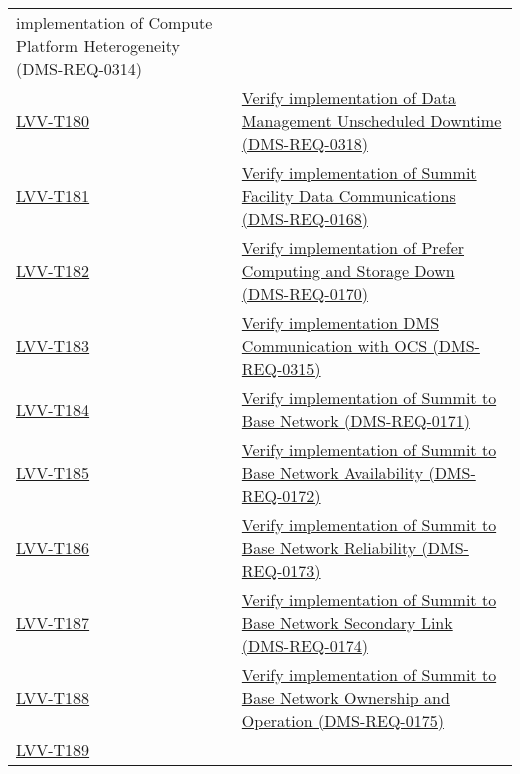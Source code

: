 \begin{longtable}[]{p{3cm}p{13cm}}
{implementation of Compute Platform Heterogeneity
(DMS-REQ-0314)}\tabularnewline
\protect\hyperlink{lvv-t180---verify-implementation-of-data-management-unscheduled-downtime-dms-req-0318}{LVV-T180}
&
\href{https://jira.lsstcorp.org/secure/Tests.jspa\#/testCase/LVV-T180}{Verify
implementation of Data Management Unscheduled Downtime
(DMS-REQ-0318)}\tabularnewline
\protect\hyperlink{lvv-t181---verify-implementation-of-summit-facility-data-communications-dms-req-0168}{LVV-T181}
&
\href{https://jira.lsstcorp.org/secure/Tests.jspa\#/testCase/LVV-T181}{Verify
implementation of Summit Facility Data Communications
(DMS-REQ-0168)}\tabularnewline
\protect\hyperlink{lvv-t182---verify-implementation-of-prefer-computing-and-storage-down-dms-req-0170}{LVV-T182}
&
\href{https://jira.lsstcorp.org/secure/Tests.jspa\#/testCase/LVV-T182}{Verify
implementation of Prefer Computing and Storage Down
(DMS-REQ-0170)}\tabularnewline
\protect\hyperlink{lvv-t183---verify-implementation-dms-communication-with-ocs-dms-req-0315}{LVV-T183}
&
\href{https://jira.lsstcorp.org/secure/Tests.jspa\#/testCase/LVV-T183}{Verify
implementation DMS Communication with OCS (DMS-REQ-0315)}\tabularnewline
\protect\hyperlink{lvv-t184---verify-implementation-of-summit-to-base-network-dms-req-0171}{LVV-T184}
&
\href{https://jira.lsstcorp.org/secure/Tests.jspa\#/testCase/LVV-T184}{Verify
implementation of Summit to Base Network (DMS-REQ-0171)}\tabularnewline
\protect\hyperlink{lvv-t185---verify-implementation-of-summit-to-base-network-availability-dms-req-0172}{LVV-T185}
&
\href{https://jira.lsstcorp.org/secure/Tests.jspa\#/testCase/LVV-T185}{Verify
implementation of Summit to Base Network Availability
(DMS-REQ-0172)}\tabularnewline
\protect\hyperlink{lvv-t186---verify-implementation-of-summit-to-base-network-reliability-dms-req-0173}{LVV-T186}
&
\href{https://jira.lsstcorp.org/secure/Tests.jspa\#/testCase/LVV-T186}{Verify
implementation of Summit to Base Network Reliability
(DMS-REQ-0173)}\tabularnewline
\protect\hyperlink{lvv-t187---verify-implementation-of-summit-to-base-network-secondary-link-dms-req-0174}{LVV-T187}
&
\href{https://jira.lsstcorp.org/secure/Tests.jspa\#/testCase/LVV-T187}{Verify
implementation of Summit to Base Network Secondary Link
(DMS-REQ-0174)}\tabularnewline
\protect\hyperlink{lvv-t188---verify-implementation-of-summit-to-base-network-ownership-and-operation-dms-req-0175}{LVV-T188}
&
\href{https://jira.lsstcorp.org/secure/Tests.jspa\#/testCase/LVV-T188}{Verify
implementation of Summit to Base Network Ownership and Operation
(DMS-REQ-0175)}\tabularnewline
\protect\hyperlink{lvv-t189---verify-implementation-of-base-facility-infrastructure-dms-req-0176}{LVV-T189}

\end{longtable}

